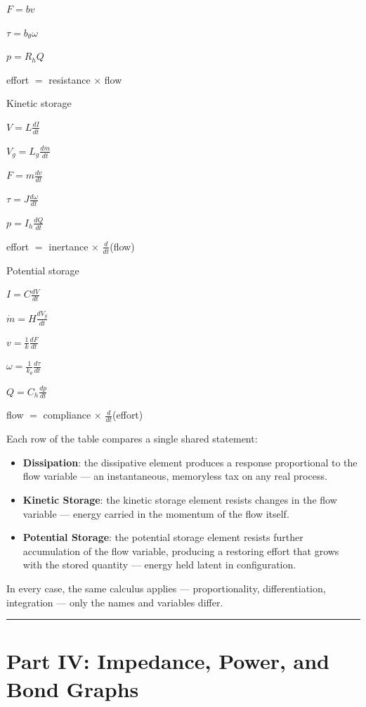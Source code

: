 \documentclass[
  letterpaper,
  DIV=11,
  numbers=noendperiod]{scrartcl}
\providecommand{\tightlist}{%
  \setlength{\itemsep}{0pt}\setlength{\parskip}{0pt}}
\begin{document}
\(F = bv\)

\(\tau = b_\theta \omega\)

\(p = R_h Q\)

effort \(=\) resistance \(\times\) flow

Kinetic storage

\(V = L\frac{dI}{dt}\)

\(V_g = L_g \frac{d\dot{m}}{dt}\)

\(F = m\frac{dv}{dt}\)

\(\tau = J\frac{d\omega}{dt}\)

\(p = I_h \frac{dQ}{dt}\)

effort \(=\) inertance \(\times\) \(\frac{d}{dt}\)(flow)

Potential storage

\(I = C\frac{dV}{dt}\)

\(\dot{m} = H\frac{dV_g}{dt}\)

\(v = \frac{1}{k}\frac{dF}{dt}\)

\(\omega = \frac{1}{k_\theta}\frac{d\tau}{dt}\)

\(Q = C_h \frac{dp}{dt}\)

flow \(=\) compliance \(\times\) \(\frac{d}{dt}\)(effort)

Each row of the table compares a single shared statement:

\begin{itemize}
\tightlist
\item
  \textbf{Dissipation}: the dissipative element produces a response
  proportional to the flow variable --- an instantaneous, memoryless tax
  on any real process.
\item
  \textbf{Kinetic Storage}: the kinetic storage element resists changes
  in the flow variable --- energy carried in the momentum of the flow
  itself.
\item
  \textbf{Potential Storage}: the potential storage element resists
  further accumulation of the flow variable, producing a restoring
  effort that grows with the stored quantity --- energy held latent in
  configuration.
\end{itemize}

In every case, the same calculus applies --- proportionality,
differentiation, integration --- only the names and variables differ.

\begin{center}\rule{0.5\linewidth}{0.5pt}\end{center}

\section{Part IV: Impedance, Power, and Bond
Graphs}\label{part-iv-impedance-power-and-bond-graphs}
\end{document}

